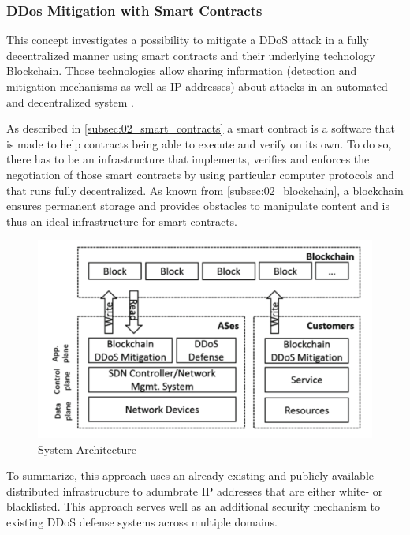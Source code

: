 \subsubsection{DDos Mitigation with Smart Contracts}
This concept investigates a possibility to mitigate a DDoS attack in a fully decentralized manner using smart contracts and their underlying technology Blockchain. Those technologies allow sharing information (detection and mitigation mechanisms as well as IP addresses) about attacks in an automated and decentralized system \cite{Rodrigues2017}.

As described in \ref{subsec:02_smart_contracts} a smart contract is a software that is made to help contracts being able to execute and verify on its own. To do so, there has to be an infrastructure that implements, verifies and enforces the negotiation of those smart contracts by using particular computer protocols and that runs fully decentralized. As known from \ref{subsec:02_blockchain}, a blockchain ensures permanent storage and provides obstacles to manipulate content and is thus an ideal infrastructure for smart contracts.

\begin{figure}[ht]
  \begin{center}
  \includegraphics[scale=0.6]{Talk7/img/ddos/collaborative_ddos_mitigation_system_architecture}
  \end{center}
  \caption{System Architecture}
  \label{system_architecture}
\end{figure}


To summarize, this approach uses an already existing and publicly available distributed infrastructure to adumbrate IP addresses that are either white- or blacklisted. This approach serves well as an additional security mechanism to existing DDoS defense systems across multiple domains.

